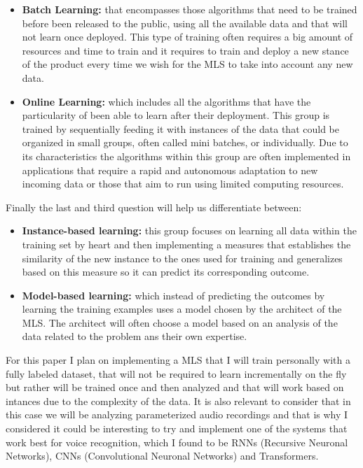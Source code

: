 \documentclass[12pt, a4paper]{article}
\begin{document}
	\begin{itemize}
	
	\item \textbf{Batch Learning:} that encompasses those algorithms that need to be trained before been released to the public, using all the available data and that will not learn once deployed. This type of training often requires a big amount of resources and time to train and it requires to train and deploy a new stance of the product every time we wish for the MLS to take into account any new data.
	
	\item \textbf{Online Learning:} which includes all the algorithms that have the particularity of been able to learn after their deployment. This group is trained by sequentially feeding it with instances of the data that could be organized in small groups, often called mini batches, or individually. Due to its characteristics the algorithms within this group are often implemented in applications that require a rapid and autonomous adaptation to new incoming data or those that aim to run using limited computing resources.
		
	\end{itemize}
	
	
	Finally the last and third question will help us differentiate between:
	
	\begin{itemize}
		
	\item \textbf{Instance-based learning:} this group focuses on learning all data within the training set by heart and then implementing a measures that establishes the similarity of the new instance to the ones used for training and generalizes based on this measure so it can predict its corresponding outcome.
	
	\item \textbf{Model-based learning:} which instead of predicting the outcomes by learning the training examples uses a model chosen by the architect of the MLS. The architect will often choose a model based on an analysis of the data related to the problem ans their own expertise.
		
	\end{itemize}

	For this paper I plan on implementing a MLS that I will train personally with a fully labeled dataset, that will not be required to learn incrementally on the fly but rather will be trained once and then analyzed and that will work based on intances due to the complexity of the data. It is also relevant to consider that in this case we will be analyzing parameterized audio recordings and that is why I considered it could be interesting to try and implement one of the systems that work best for voice recognition, which I found to be RNNs (Recursive Neuronal Networks), CNNs (Convolutional Neuronal Networks) and Transformers.
	
\end{document}
